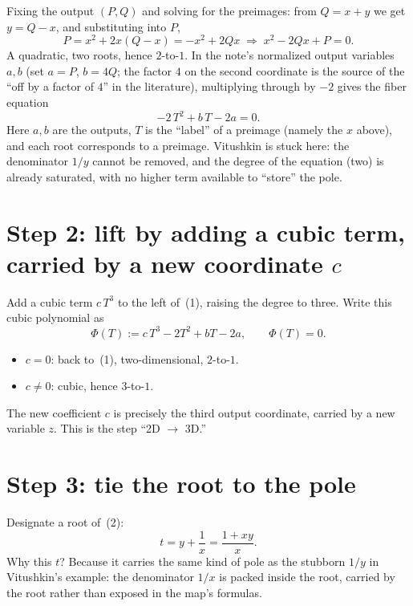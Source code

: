 \documentclass[11pt]{article}
\theoremstyle{plain}
\theoremstyle{definition}
\begin{document}
Fixing the output $(P,Q)$ and solving for the preimages: from $Q=x+y$ we get
$y=Q-x$, and substituting into $P$,
\[
  P = x^2+2x(Q-x) = -x^2+2Qx
  \;\Longrightarrow\;
  x^2-2Qx+P = 0 .
\]
A quadratic, two roots, hence $2$-to-$1$. In the note's normalized output
variables $a,b$ (set $a=P$, $b=4Q$; the factor $4$ on the second coordinate
is the source of the ``off by a factor of $4$'' in the literature),
multiplying through by $-2$ gives the fiber equation
\begin{equation}
  -2\,T^2 + b\,T - 2a = 0 . \label{eq:fiber2d}
\end{equation}
Here $a,b$ are the outputs, $T$ is the ``label'' of a preimage (namely the
$x$ above), and each root corresponds to a preimage. Vitushkin is stuck
here: the denominator $1/y$ cannot be removed, and the degree of the
equation (two) is already saturated, with no higher term available to
``store'' the pole.

\section*{Step 2: lift by adding a cubic term, carried by a new coordinate $c$}
Add a cubic term $c\,T^3$ to the left of~(1), raising the degree to three.
Write this cubic polynomial as
\begin{equation}
  \Phi(T):=c\,T^3 - 2T^2 + bT - 2a,\qquad \Phi(T)=0 . \label{eq:fiber3d}
\end{equation}
\begin{itemize}[nosep]
  \item $c=0$: back to~(1), two-dimensional, $2$-to-$1$.
  \item $c\neq 0$: cubic, hence $3$-to-$1$.
\end{itemize}
The new coefficient $c$ is precisely the third output coordinate, carried by
a new variable $z$. This is the step ``2D $\to$ 3D.''

\section*{Step 3: tie the root to the pole}
Designate a root of~(2):
\[
  t = y + \frac{1}{x} = \frac{1+xy}{x}.
\]
Why this $t$? Because it carries the same kind of pole as the stubborn $1/y$
in Vitushkin's example: the denominator $1/x$ is packed inside the root,
carried by the root rather than exposed in the map's formulas.
\end{document}
